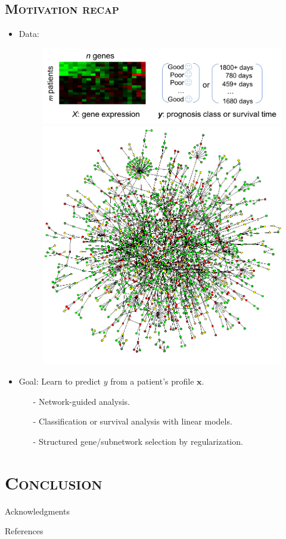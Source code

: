 \documentclass[xcolor=x11names,compress]{beamer}
\theoremstyle{plain}
\renewcommand{\(}{\begin{columns}}
\renewcommand{\)}{\end{columns}}
\newcommand{\<}[1]{\begin{column}{#1}}
\renewcommand{\>}{\end{column}}
\begin{document}
\subsection{\scshape Motivation recap}
\begin{frame}{\insertsubsection}
	
	\begin{itemize}
		\item Data: 
		\begin{figure}
			\centering
			\includegraphics[width=0.7\linewidth]{slides/prognosis}%
			\hskip 0.1cm%
			\includegraphics[width=0.25\linewidth]{slides/ppi}
		\end{figure}
		
		\item Goal: Learn to predict $y$ from a patient's profile $\mathbf{x}$.
		\begin{itemize}
			\item[-] Network-guided analysis.
			\item[-] Classification or survival analysis with linear models.
			\item[-] Structured gene/subnetwork selection by regularization.
		\end{itemize}
	\end{itemize}
	
\end{frame}


\section{\scshape Conclusion}


\begin{frame}{\insertsection}
	
\end{frame}


\begin{frame}{Acknowledgments}
	
\end{frame}


\begin{frame}[allowframebreaks]{References}
	
	\tiny
	
	
	
\end{frame}
\end{document}
